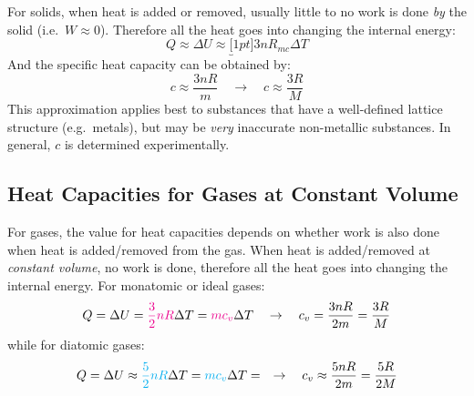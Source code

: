 For solids, when heat is added or removed, usually little to no work is done
\emph{by} the solid (i.e.\ $W\approx 0$). Therefore all the heat goes into
changing the internal energy:
\begin{equation}
  Q\approx\Delta U\approx\underbracket[1pt]{3nR}_{mc}\Delta T
\end{equation}
And the specific heat capacity can be obtained by:
\begin{equation}
  c\approx\frac{3nR}m\quad\rightarrow\quad c\approx\frac{3R}M
\end{equation}
This approximation applies best to substances that have a well-defined lattice
structure (e.g.\ metals), but may be \emph{very} inaccurate non-metallic
substances. In general, $c$ is determined experimentally.




\subsection{Heat Capacities for Gases at Constant Volume}

For gases, the value for heat capacities depends on whether work is also done
when heat is added/removed from the gas. When heat is added/removed at
\emph{constant volume}, no work is done, therefore all the heat goes into
changing the internal energy. For monatomic or ideal gases:
\begin{equation}
  Q=\Delta U={\color{magenta}\frac32nR}\Delta T=
  {\color{magenta}mc_v}\Delta T\quad\rightarrow\quad
  c_v=\frac{3nR}{2m}=\frac{3R}M
\end{equation}
while for diatomic gases:
\begin{equation}
  Q=\Delta U\approx{\color{cyan}\frac52nR}\Delta T
  ={\color{cyan}mc_v}\Delta T=\quad\rightarrow\quad
  c_v\approx\frac{5nR}{2m}=\frac{5R}{2M}
\end{equation}




%
%
%


